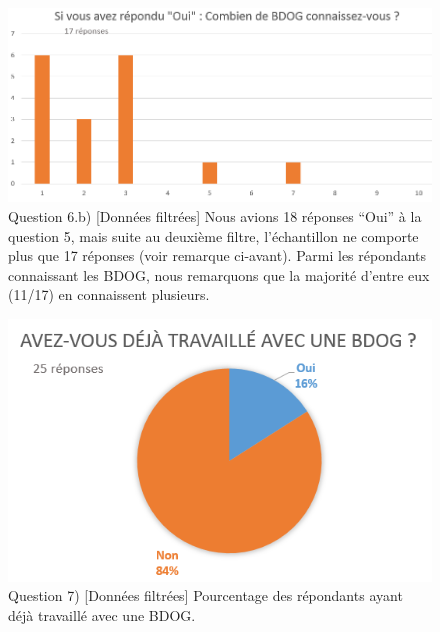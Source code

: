 \documentclass[a4paper,fleqn,12pt,oneside]{book}
\begin{document}
\begin{figure}[!ht]
\centering
\includegraphics[scale=0.8]{figures/QNbFilt.png}
\caption{Question 6.b) [Données filtrées] Nous avions 18 réponses \enquote{Oui} à la question 5, mais suite au deuxième filtre, l'échantillon ne comporte plus que 17 réponses (voir remarque ci-avant). Parmi les répondants connaissant les BDOG, nous remarquons que la majorité d'entre eux (11/17) en connaissent plusieurs.}
\label{fig:QNbFilt}
\end{figure}

\begin{figure}[!ht]
\centering
\includegraphics[scale=0.8]{figures/QTravFilt.png}
\caption{Question 7) [Données filtrées] Pourcentage des répondants ayant déjà travaillé avec une BDOG.}
\label{fig:QTravFilt}
\end{figure}

\newpage
{}
\end{document}
